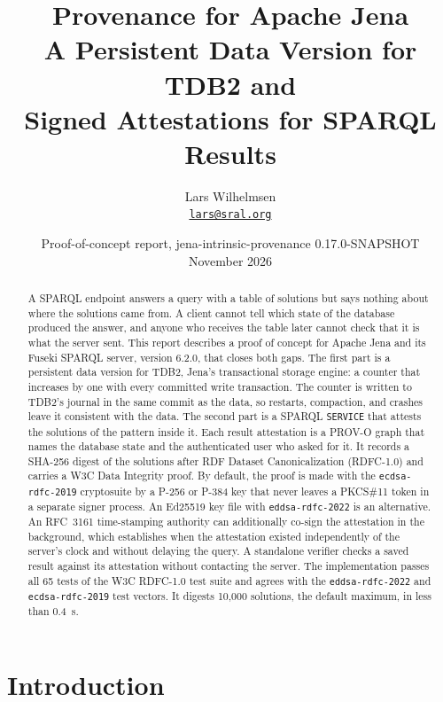 \documentclass[11pt,a4paper]{article}
\title{\sffamily\bfseries\color{accent}Provenance for Apache Jena\\[0.4em]
  \Large\mdseries\color{black}A Persistent Data Version for TDB2 and\\Signed Attestations for SPARQL Results}
\author{\large Lars Wilhelmsen\\[0.2em]\normalsize\href{mailto:lars@sral.org}{\texttt{lars@sral.org}}}
\date{\normalsize Proof-of-concept report, jena-intrinsic-provenance 0.17.0-SNAPSHOT\\[0.2em]November 2026}
\newcommand{\code}[1]{\texttt{#1}}
\begin{document}
\maketitle
\thispagestyle{plain}

\begin{abstract}
\noindent
A SPARQL endpoint answers a query with a table of solutions but says nothing about where the
solutions came from. A client cannot tell which state of the database produced the answer, and
anyone who receives the table later cannot check that it is what the server sent. This report
describes a proof of concept for Apache Jena and its Fuseki SPARQL server, version 6.2.0, that
closes both gaps. The first part is a persistent data version for TDB2, Jena's transactional
storage engine: a counter that increases by one with every committed write transaction. The
counter is written to TDB2's journal in the same commit as the data, so restarts, compaction,
and crashes leave it consistent with the data. The second part is
a SPARQL \code{SERVICE} that attests the solutions of the pattern inside it. Each result
attestation is a PROV-O graph that names the database state and the authenticated user who
asked for it. It records a SHA-256 digest of the solutions after RDF Dataset Canonicalization
(RDFC-1.0) and carries a W3C Data Integrity proof. By default, the proof is made with the
\code{ecdsa-rdfc-2019} cryptosuite by a P-256 or P-384 key that never leaves a PKCS\#11 token in
a separate signer process. An Ed25519 key file with \code{eddsa-rdfc-2022} is an alternative.
An RFC~3161 time-stamping authority can additionally co-sign the attestation in the
background, which establishes when the attestation existed independently of the server's clock
and without delaying the query. A standalone verifier checks a saved result against its
attestation without contacting the server. The implementation passes all 65 tests of the W3C
RDFC-1.0 test suite and agrees with the \code{eddsa-rdfc-2022} and \code{ecdsa-rdfc-2019} test
vectors. It digests 10,000 solutions, the default maximum, in less than 0.4~s.
\end{abstract}
\clearpage

\setcounter{tocdepth}{1}
\tableofcontents
\clearpage

\section{Introduction}
\label{sec:intro}
\end{document}
